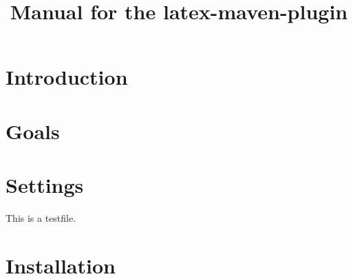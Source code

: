 \documentclass[12pt]{article}
\title{Manual for the latex-maven-plugin}
\begin{document}
\maketitle

\tableofcontents

\section{Introduction}
\section{Goals}
\section{Settings}
This is a testfile. 
\begin{longtable}

\end{longtable}

\section{Installation}
\end{document}
